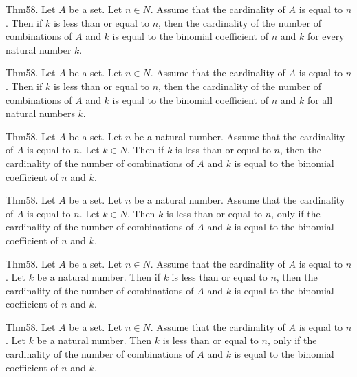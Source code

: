 \documentclass{article}
\begin{document}
Thm58. Let $A$ be a set. Let $n \in N$. Assume that the cardinality of $A$ is equal to $n$. Then if $k$ is less than or equal to $n$, then the cardinality of the number of combinations of $A$ and $k$ is equal to the binomial coefficient of $n$ and $k$ for every natural number $k$.

Thm58. Let $A$ be a set. Let $n \in N$. Assume that the cardinality of $A$ is equal to $n$. Then if $k$ is less than or equal to $n$, then the cardinality of the number of combinations of $A$ and $k$ is equal to the binomial coefficient of $n$ and $k$ for all natural numbers $k$.

Thm58. Let $A$ be a set. Let $n$ be a natural number. Assume that the cardinality of $A$ is equal to $n$. Let $k \in N$. Then if $k$ is less than or equal to $n$, then the cardinality of the number of combinations of $A$ and $k$ is equal to the binomial coefficient of $n$ and $k$.

Thm58. Let $A$ be a set. Let $n$ be a natural number. Assume that the cardinality of $A$ is equal to $n$. Let $k \in N$. Then $k$ is less than or equal to $n$, only if the cardinality of the number of combinations of $A$ and $k$ is equal to the binomial coefficient of $n$ and $k$.

Thm58. Let $A$ be a set. Let $n \in N$. Assume that the cardinality of $A$ is equal to $n$. Let $k$ be a natural number. Then if $k$ is less than or equal to $n$, then the cardinality of the number of combinations of $A$ and $k$ is equal to the binomial coefficient of $n$ and $k$.

Thm58. Let $A$ be a set. Let $n \in N$. Assume that the cardinality of $A$ is equal to $n$. Let $k$ be a natural number. Then $k$ is less than or equal to $n$, only if the cardinality of the number of combinations of $A$ and $k$ is equal to the binomial coefficient of $n$ and $k$.
\end{document}
